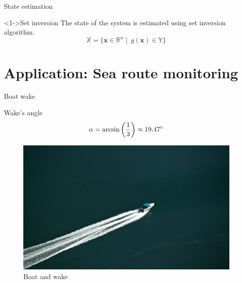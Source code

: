 \documentclass{beamer}
\begin{document}
        \begin{frame}{State estimation}
            \begin{block}<1->{Set inversion}
                The state of the system is estimated using set inversion algorithm.
                \begin{equation}
                    \mathbb{X} = \lbrace \mathbf{x} \in \mathbb{R}^n \mid\ g(\mathbf{x}) \in \mathbb{Y}\rbrace
                \end{equation}
            \end{block}
        \end{frame}

    \section{Application: Sea route monitoring}

        \begin{frame}{Boat wake}
            \centering
            \begin{minipage}{0.6\textwidth}
                \begin{block}{Wake's angle}
                    \begin{equation}
                        \alpha = \arcsin\left(\frac{1}{3}\right) \approx 19.47 \degree
                    \end{equation}
                \end{block}
                \vspace{0.2cm}
                \begin{figure}
                    \centering
                    \includegraphics[width=\textwidth,trim={0 0 17cm 14cm},clip]{imgs/motorboat}
                    \caption{Boat and wake}
                \end{figure}
            \end{minipage}
        \end{frame}
\end{document}
